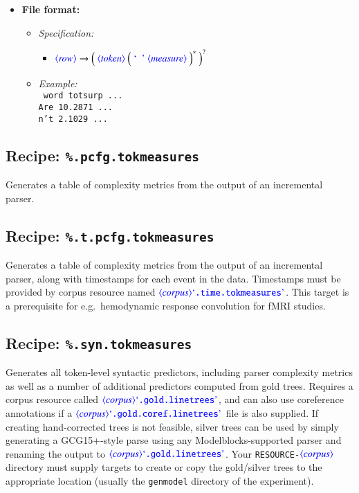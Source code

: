 \documentclass[12pt]{report}
\def\blue{\color{blue}}
\def\magenta{\color{magenta}}
\begin{document}
\begin{itemize}
      \item \textbf{File format:}
      \begin{itemize}
            \item \textit{Specification:}\\
                  \begin{itemize}
                  \item $\dtype{row} \rightarrow \Big( \ \dtype{token} \ \Big( \ \dcode{\ } \ \dtype{measure} \ \Big)^* \ \Big)^?$
                  \end{itemize}
            \item \textit{Example:}\\
                  {\magenta\tt
                  word totsurp ...\\
                  Are 10.2871 ...\\
                  n't 2.1029 ...
                  }
      \end{itemize}
\end{itemize}

\subsection{Recipe: {\blue\tt \%.pcfg.tokmeasures}}
Generates a table of complexity metrics from the output of an incremental parser.

\subsection{Recipe: {\blue\tt \%.t.pcfg.tokmeasures}}
Generates a table of complexity metrics from the output of an incremental parser, along with timestamps for each event in the data.
Timestamps must be provided by corpus resource named {\tt\blue $\dtype{corpus} \dcode{.time.tokmeasures}$}.
This target is a prerequisite for e.g.\ hemodynamic response convolution for fMRI studies.

\subsection{Recipe: {\blue\tt \%.syn.tokmeasures}}
Generates all token-level syntactic predictors, including parser complexity metrics as well as a number of additional predictors computed from gold trees.
Requires a corpus resource called {\tt\blue $\dtype{corpus} \dcode{.gold.linetrees}$}, and can also use coreference annotations if a {\tt\blue $\dtype{corpus} \dcode{.gold.coref.linetrees}$} file is also supplied.
If creating hand-corrected trees is not feasible, silver trees can be used by simply generating a GCG15+-style parse using any Modelblocks-supported parser and renaming the output to {\tt\blue $\dtype{corpus} \dcode{.gold.linetrees}$}.
Your {\tt RESOURCE-$\dtype{corpus}$} directory must supply targets to create or copy the gold/silver trees to the appropriate location (usually the {\tt\blue genmodel} directory of the experiment).
\end{document}
